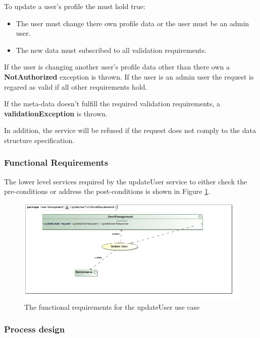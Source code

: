 To update a user's profile the must hold true:
\begin{itemize}
	\item The user must change there own profile data or the user must be an admin user.
	\item The new data must subscribed to all validation requirements.
\end{itemize}

If the user is changing another user's profile data other than there own a \textbf{NotAuthorized} exception is thrown.  If the user is an admin user the request is regared as valid if all other requirements hold.

If the meta-data doesn't fulfill the required validation requirements, a \textbf{validationException} is thrown.

In addition, the service will be refused if the request does not comply to the data structure specification.

\subsubsection{Functional Requirements}
The lower level services required by the updateUser service to either check the
pre-conditions or address the post-conditions is shown in Figure \ref{fig:updateUserUseCase}.

\begin{figure}[H]
	\begin{center}
		\includegraphics[scale=0.5]{../Diagrams and Charts/Users/UpdateUserFunctionalRequirements.jpg}
		\caption{The functional requirements for the updateUser use case}
		\label{fig:updateUserUseCase}
	\end{center}	
\end{figure}
\subsubsection{Process design}

